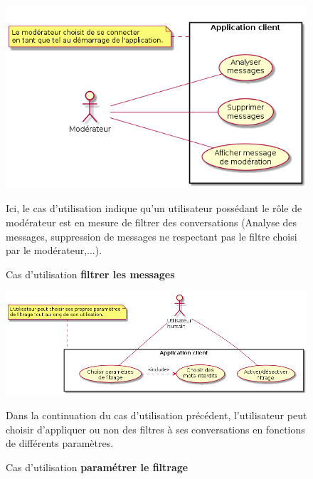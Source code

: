 \documentclass[11pt,dvipsnames,svgnames]{report}
\begin{document}
\begin{center}
\begin{figure}
\includegraphics[scale=0.7]{images/uc-filtrerMessages.png}
\vspace{5\baselineskip}
\caption{Cas d'utilisation \textbf{filtrer les messages}}	
	Ici, le cas d'utilisation indique qu'un utilisateur possédant le rôle de modérateur est en mesure de filtrer des conversations (Analyse des messages, suppression de messages ne respectant pas le filtre choisi par le modérateur,...).
\end{figure}

\begin{figure}
\includegraphics[scale=0.6]{images/uc-parametrerFiltrage.png}
\caption{Cas d'utilisation \textbf{paramétrer le filtrage}}
	Dans la continuation du cas d'utilisation précédent, l'utilisateur peut choisir d'appliquer ou non des filtres à ses conversations en fonctions de différents paramètres.
\end{figure}


\end{center}
\end{document}
